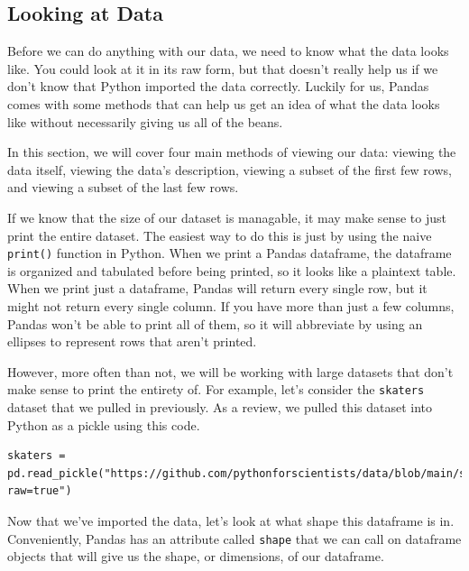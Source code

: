 \subsection{Looking at Data}
Before we can do anything with our data, we need to know what the data looks like. You could look at it in its raw form, but that doesn't really help us if we don't know that Python imported the data correctly. Luckily for us, Pandas comes with some methods that can help us get an idea of what the data looks like without necessarily giving us all of the beans.\par
{}
In this section, we will cover four main methods of viewing our data: viewing the data itself, viewing the data's description, viewing a subset of the first few rows, and viewing a subset of the last few rows.\par
If we know that the size of our dataset is managable, it may make sense to just print the entire dataset. The easiest way to do this is just by using the naive \verb|print()| function in Python. When we print a Pandas dataframe, the dataframe is organized and tabulated before being printed, so it looks like a plaintext table. When we print just a dataframe, Pandas will return every single row, but it might not return every single column. If you have more than just a few columns, Pandas won't be able to print all of them, so it will abbreviate by using an ellipses to represent rows that aren't printed.\par
However, more often than not, we will be working with large datasets that don't make sense to print the entirety of. For example, let's consider the \verb|skaters| dataset that we pulled in previously. As a review, we pulled this dataset into Python as a pickle using this code.\par
\begin{lstlisting}[style=pippython]
skaters = pd.read_pickle("https://github.com/pythonforscientists/data/blob/main/skaters.pkl?raw=true")
\end{lstlisting}
Now that we've imported the data, let's look at what shape this dataframe is in. Conveniently, Pandas has an attribute called \verb|shape| that we can call on dataframe objects that will give us the shape, or dimensions, of our dataframe.\par
